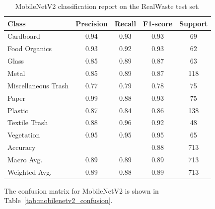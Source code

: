 \documentclass[12pt,a4paper]{article}
\begin{document}
\begin{table}[H]
    \centering
    \caption{MobileNetV2 classification report on the RealWaste test set.}
    \label{tab:mobilenetv2_classification}
    \begin{tabular}{lcccc}
        \hline
        Class & Precision & Recall & F1-score & Support \\
        \hline
        Cardboard & 0.94 & 0.93 & 0.93 & 69 \\
        Food Organics & 0.93 & 0.92 & 0.93 & 62 \\
        Glass & 0.85 & 0.89 & 0.87 & 63 \\
        Metal & 0.85 & 0.89 & 0.87 & 118 \\
        Miscellaneous Trash & 0.77 & 0.79 & 0.78 & 75 \\
        Paper & 0.99 & 0.88 & 0.93 & 75 \\
        Plastic & 0.87 & 0.84 & 0.86 & 138 \\
        Textile Trash & 0.88 & 0.96 & 0.92 & 48 \\
        Vegetation & 0.95 & 0.95 & 0.95 & 65 \\
        \hline
        Accuracy & & & 0.88 & 713 \\
        Macro Avg. & 0.89 & 0.89 & 0.89 & 713 \\
        Weighted Avg. & 0.89 & 0.88 & 0.89 & 713 \\
        \hline
    \end{tabular}
\end{table}

The confusion matrix for MobileNetV2 is shown in Table~\ref{tab:mobilenetv2_confusion}.

\begin{table}[H]
    \centering
    \caption{MobileNetV2 confusion matrix on the RealWaste test set.}
    \label{tab:mobilenetv2_confusion}
\end{table}
\end{document}
